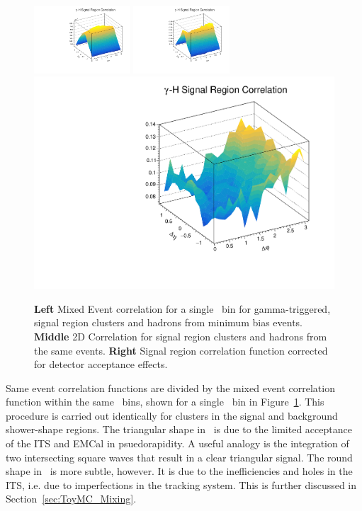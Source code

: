 \begin{figure}
  \includegraphics[width=0.32\textwidth]{Data_Analysis/G-H_New/2D_SR_ME.pdf}
  \includegraphics[width=0.32\textwidth]{Data_Analysis/G-H_New/2D_SR_SE.pdf}
  \includegraphics[width = 0.32 \textwidth]{Data_Analysis/G-H_New/2D_SR.pdf}
  \caption{\textbf{Left} Mixed Event correlation for a single \zt~bin for gamma-triggered, signal region clusters and hadrons from minimum bias events. \textbf{Middle} 2D Correlation for signal region clusters and hadrons from the same events. \textbf{Right} Signal region correlation function corrected for detector acceptance effects.}
  \label{fig:SR_2D}
\end{figure}

Same event correlation functions are divided by the mixed event correlation function within the same \zt~bins, shown for a single \zt~bin in Figure~\ref{fig:SR_2D}. This procedure is carried out identically for clusters in the signal and background shower-shape regions. The triangular shape in \deltaeta~is due to the limited acceptance of the ITS and EMCal in psuedorapidity. A useful analogy is the integration of two intersecting square waves that result in a clear triangular signal. The round shape in \deltaphi~is more subtle, however. It is due to the inefficiencies and holes in the ITS, i.e. due to imperfections in the tracking system. This is further discussed in Section~\ref{sec:ToyMC_Mixing}.




